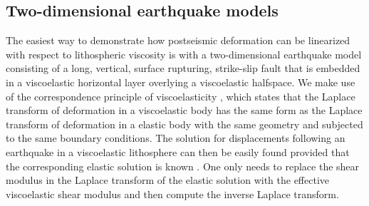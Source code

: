 \documentclass[extra,mreferee]{gji}
\begin{document}
\subsection{Two-dimensional earthquake models}
The easiest way to demonstrate how postseismic deformation can be
linearized with respect to lithospheric viscosity is with a
two-dimensional earthquake model consisting of a long, vertical,
surface rupturing, strike-slip fault that is embedded in a
viscoelastic horizontal layer overlying a viscoelastic halfspace.  We
make use of the correspondence principle of viscoelasticity
\citep[e.g.][]{F1975}, which states that the Laplace transform of
deformation in a viscoelastic body has the same form as the Laplace
transform of deformation in a elastic body with the same geometry and
subjected to the same boundary conditions. The solution for
displacements following an earthquake in a viscoelastic lithosphere
can then be easily found provided that the corresponding elastic
solution is known \citep[e.g.][]{NM1974,SP1978,HH2005}.  One only
needs to replace the shear modulus in the Laplace transform of the
elastic solution with the effective viscoelastic shear modulus and
then compute the inverse Laplace transform.
\end{document}
